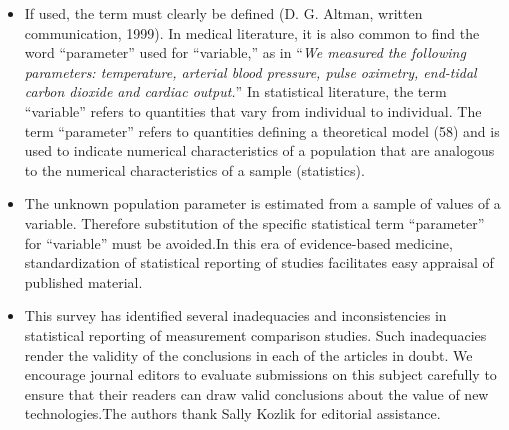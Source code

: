 \documentclass[MAIN.tex]{subfiles}
\begin{document}
\begin{itemize}
		\item If used, the term must clearly be defined (D. G. Altman, written communication, 1999). In medical literature, it is also common to find the word “parameter” used for “variable,” as in “\textit{We measured the following parameters: temperature, arterial blood pressure, pulse oximetry, end-tidal carbon dioxide and cardiac output.}” In statistical literature, the term “variable” refers to quantities that vary from individual to individual. The term “parameter” refers to quantities defining a theoretical model (58) and is used to indicate numerical characteristics of a population that are analogous to the numerical characteristics of a sample (statistics). 
		
		
		\item The unknown population parameter is estimated from a sample of values of a variable. Therefore substitution of the specific statistical term “parameter” for “variable” must be avoided.In this era of evidence-based medicine, standardization of statistical reporting of studies facilitates easy appraisal of published material. 
		
		\item This survey has identified several inadequacies and inconsistencies in statistical reporting of measurement comparison studies. Such inadequacies render the validity of the conclusions in each of the articles in doubt. We encourage journal editors to evaluate submissions on this subject carefully to ensure that their readers can draw valid conclusions about the value of new technologies.The authors thank Sally Kozlik for editorial assistance.
	\end{itemize}
\end{document}
